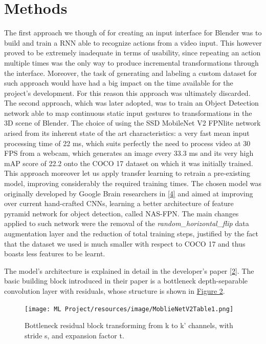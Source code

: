 \documentclass[a4paper, 12pt]{article}
\begin{document}
\section{Methods}
\begin{flushleft}
The first approach we though of for creating an input interface for Blender was to build and train a RNN able to recognize actions from a video input. This however proved to be extremely inadequate in terms of usability, since repeating an action multiple times was the only way to produce incremental transformations through the interface. Moreover, the task of generating and labeling a custom dataset for such approach would have had a big impact on the time available for the project's development. For this reason this approach was ultimately discarded.\linebreak
The second approach, which was later adopted, was to train an Object Detection network able to map continuous static input gestures to transformations in the 3D scene of Blender. The choice of using the SSD MobileNet V2 FPNlite network arised from its inherent state of the art characteristics: a very fast mean input processing time of 22 ms, which suits perfectly the need to process video at 30 FPS from a webcam, which generates an image every 33.3 ms and its very high mAP score of 22.2 onto the COCO 17 dataset on which it was initially trained.\linebreak
This approach moreover let us apply transfer learning to retrain a pre-existing model, improving considerably the required training times.
The chosen model was originally developed by Google Brain researchers in \hyperref[Ref1]{[4]} and aimed at improving over current hand-crafted CNNs, learning a better architecture of feature pyramid network for object detection, called NAS-FPN. The main changes applied to such network were the removal of the \textit{random\_horizontal\_flip} data augmentation layer and the reduction of total training steps, justified by the fact that the dataset we used is much smaller with respect to COCO 17 and thus boasts less features to be learnt.\linebreak

The model's architecture is explained in detail in the developer's paper \hyperref[RefArchSSD]{[2]}.
The basic building block introduced in their paper is a bottleneck depth-separable convolution layer with residuals, whose structure is shown in \hyperref[figure2]{Figure 2}.

\begin{figure}[!h]
    \centering
    \texttt{[image: ML Project/resources/image/MoblieNetV2Table1.png]} \caption{Bottleneck residual block transforming from k to k' channels, with stride s, and expansion factor t.}
\end{figure}
\label{figure2}


\end{flushleft}
\end{document}
